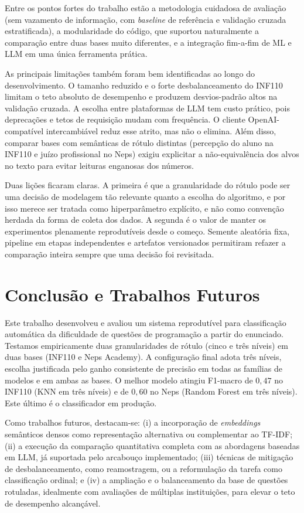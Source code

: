 \documentclass[sigconf]{webmedia}
\begin{document}
Entre os pontos fortes do trabalho estão a metodologia cuidadosa de avaliação (sem vazamento de informação, com \textit{baseline} de referência e validação cruzada estratificada), a modularidade do código, que suportou naturalmente a comparação entre duas bases muito diferentes, e a integração fim-a-fim de ML e LLM em uma única ferramenta prática.

As principais limitações também foram bem identificadas ao longo do desenvolvimento. O tamanho reduzido e o forte desbalanceamento do INF110 limitam o teto absoluto de desempenho e produzem desvios-padrão altos na validação cruzada. A escolha entre plataformas de LLM tem custo prático, pois deprecações e tetos de requisição mudam com frequência. O cliente OpenAI-compatível intercambiável reduz esse atrito, mas não o elimina. Além disso, comparar bases com semânticas de rótulo distintas (percepção do aluno na INF110 e juízo profissional no Neps) exigiu explicitar a não-equivalência dos alvos no texto para evitar leituras enganosas dos números.

Duas lições ficaram claras. A primeira é que a granularidade do rótulo pode ser uma decisão de modelagem tão relevante quanto a escolha do algoritmo, e por isso merece ser tratada como hiperparâmetro explícito, e não como convenção herdada da forma de coleta dos dados. A segunda é o valor de manter os experimentos plenamente reprodutíveis desde o começo. Semente aleatória fixa, pipeline em etapas independentes e artefatos versionados permitiram refazer a comparação inteira sempre que uma decisão foi revisitada.

\section{Conclusão e Trabalhos Futuros}
\label{sec:conclusao}

Este trabalho desenvolveu e avaliou um sistema reprodutível para classificação automática da dificuldade de questões de programação a partir do enunciado. Testamos empiricamente duas granularidades de rótulo (cinco e três níveis) em duas bases (INF110 e Neps Academy). A configuração final adota três níveis, escolha justificada pelo ganho consistente de precisão em todas as famílias de modelos e em ambas as bases. O melhor modelo atingiu F1-macro de $0{,}47$ no INF110 (KNN em três níveis) e de $0{,}60$ no Neps (Random Forest em três níveis). Este último é o classificador em produção.

Como trabalhos futuros, destacam-se: (i) a incorporação de \textit{embeddings} semânticos densos como representação alternativa ou complementar ao TF-IDF; (ii) a execução da comparação quantitativa completa com as abordagens baseadas em LLM, já suportada pelo arcabouço implementado; (iii) técnicas de mitigação de desbalanceamento, como reamostragem, ou a reformulação da tarefa como classificação ordinal; e (iv) a ampliação e o balanceamento da base de questões rotuladas, idealmente com avaliações de múltiplas instituições, para elevar o teto de desempenho alcançável.
\end{document}
